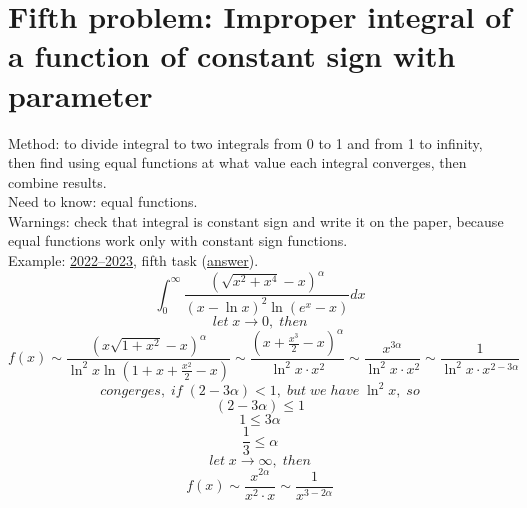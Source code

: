 \documentclass{article}
\begin{document}
\section{Fifth problem: Improper integral of a function of constant sign with parameter}
Method: to divide integral to two integrals from 0 to 1 and from 1 to infinity, then find using equal functions at what value each integral converges, then combine results. \\
Need to know: equal functions. \\
Warnings: check that integral is constant sign and write it on the paper, because equal functions work only with constant sign functions. \\
Example: \href{https://old.mipt.ru/education/chair/mathematics/exams/exams/2022-23/%D0%9C%D0%90%D0%98%D0%B8%D0%A0_%D0%92_23.pdf}{2022–2023}, fifth task (\href{https://old.mipt.ru/education/chair/mathematics/exams/exams/2022-23/%D0%9C%D0%90%D0%98%D0%B8%D0%A0_%D0%92_23%D0%BE%D1%82%D0%B2%D0%B5%D1%82%D1%8B.pdf}{answer}).
\begin{equation}
    \int_{0}^{\infty} \frac{(\sqrt{x^2+x^4}-x)^\alpha }{(x- \ln x)^2 \ln (e^x-x)} dx
\end{equation}
\begin{equation*}
    let \; x \rightarrow 0, \; then
\end{equation*}
\begin{equation*}
    f(x) \sim \frac{(x \sqrt{1+x^2}-x)^\alpha}{\ln^2 x \ln (1+x+\frac{x^2}{2}-x)} \sim \frac{(x+\frac{x^3}{2}-x)^\alpha}{\ln^2 x \cdot x^2} \sim \frac{x^{3\alpha}}{\ln^2 x \cdot x^2} \sim \frac{1}{\ln^2 x \cdot x^{2-3\alpha}}
\end{equation*}
\begin{equation*}
    congerges, \; if \; (2-3\alpha)<1, \; but \; we \; have \; \ln ^ 2 x, \; so
\end{equation*}
\begin{equation*}
    (2-3\alpha) \leq 1
\end{equation*}
\begin{equation*}
    1 \leq 3 \alpha
\end{equation*}
\begin{equation}
    \frac{1}{3} \leq \alpha
\end{equation}
\begin{equation*}
    let \; x \rightarrow \infty, \; then
\end{equation*}
\begin{equation*}
    f(x) \sim \frac{x^{2 \alpha}}{x^2 \cdot x} \sim \frac{1}{x^{3-2\alpha}}
\end{equation*}
\end{document}
